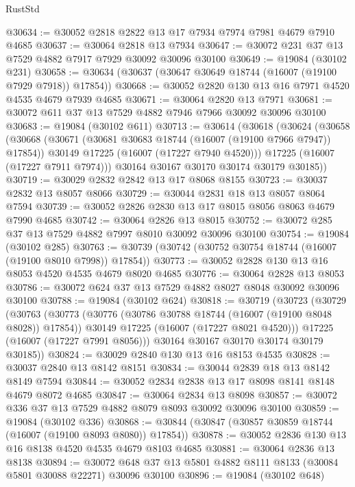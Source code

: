 \begin{lexlean}{RustStd}
\begin{coremodule}
@30634 := @30052 @2818 @2822 @13 @17 @7934 @7974 @7981 @4679 @7910 @4685
@30637 := @30064 @2818 @13 @7934
@30647 := @30072 @231 @37 @13 @7529 @4882 @7917 @7929 @30092 @30096 @30100
@30649 := @19084 (@30102 @231)
@30658 := @30634 (@30637 (@30647 @30649 @18744 (@16007 (@19100 @7929 @7918)) @17854))
@30668 := @30052 @2820 @130 @13 @16 @7971 @4520 @4535 @4679 @7939 @4685
@30671 := @30064 @2820 @13 @7971
@30681 := @30072 @611 @37 @13 @7529 @4882 @7946 @7966 @30092 @30096 @30100
@30683 := @19084 (@30102 @611)
@30713 := @30614
    (@30618
      (@30624
        (@30658
          (@30668
            (@30671 (@30681 @30683 @18744 (@16007 (@19100 @7966 @7947)) @17854))
            @30149
            @17225
            (@16007 (@17227 @7940 @4520)))
          @17225
          (@16007 (@17227 @7911 @7974)))
        @30164
        @30167
        @30170
        @30174
        @30179
        @30185))
@30719 := @30029 @2832 @2842 @13 @17 @8068 @8155
@30723 := @30037 @2832 @13 @8057 @8066
@30729 := @30044 @2831 @18 @13 @8057 @8064 @7594
@30739 := @30052 @2826 @2830 @13 @17 @8015 @8056 @8063 @4679 @7990 @4685
@30742 := @30064 @2826 @13 @8015
@30752 := @30072 @285 @37 @13 @7529 @4882 @7997 @8010 @30092 @30096 @30100
@30754 := @19084 (@30102 @285)
@30763 := @30739 (@30742 (@30752 @30754 @18744 (@16007 (@19100 @8010 @7998)) @17854))
@30773 := @30052 @2828 @130 @13 @16 @8053 @4520 @4535 @4679 @8020 @4685
@30776 := @30064 @2828 @13 @8053
@30786 := @30072 @624 @37 @13 @7529 @4882 @8027 @8048 @30092 @30096 @30100
@30788 := @19084 (@30102 @624)
@30818 := @30719
    (@30723
      (@30729
        (@30763
          (@30773
            (@30776 (@30786 @30788 @18744 (@16007 (@19100 @8048 @8028)) @17854))
            @30149
            @17225
            (@16007 (@17227 @8021 @4520)))
          @17225
          (@16007 (@17227 @7991 @8056)))
        @30164
        @30167
        @30170
        @30174
        @30179
        @30185))
@30824 := @30029 @2840 @130 @13 @16 @8153 @4535
@30828 := @30037 @2840 @13 @8142 @8151
@30834 := @30044 @2839 @18 @13 @8142 @8149 @7594
@30844 := @30052 @2834 @2838 @13 @17 @8098 @8141 @8148 @4679 @8072 @4685
@30847 := @30064 @2834 @13 @8098
@30857 := @30072 @336 @37 @13 @7529 @4882 @8079 @8093 @30092 @30096 @30100
@30859 := @19084 (@30102 @336)
@30868 := @30844 (@30847 (@30857 @30859 @18744 (@16007 (@19100 @8093 @8080)) @17854))
@30878 := @30052 @2836 @130 @13 @16 @8138 @4520 @4535 @4679 @8103 @4685
@30881 := @30064 @2836 @13 @8138
@30894 := @30072 @648 @37 @13 @5801 @4882 @8111 @8133 (@30084 @5801 @30088 @22271) @30096 @30100
@30896 := @19084 (@30102 @648)

\end{coremodule}
\end{lexlean}
